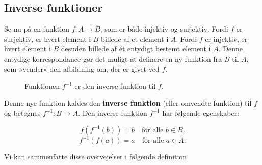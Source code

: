 \subsection*{Inverse funktioner}

Se nu på en funktion \( f: A \rightarrow B \), som er både injektiv og surjektiv. Fordi \( f \) er surjektiv, er hvert element i \( B \) billede af et element i \( A \). Fordi \( f \) er injektiv, er hvert element i \( B \) desuden billede af ét entydigt bestemt element i \( A \). Denne entydige korrespondance gør det muligt at definere en ny funktion fra \( B \) til \( A \), som »vender« den afbildning om, der er givet ved \( f \).

\begin{figure}[htbp]
\centering
{}
\caption{Funktionen $f^{-1}$ er den inverse funktion til $f$.}
\label{fig:inv}
\end{figure}

Denne nye funktion kaldes den \textbf{inverse funktion} (eller omvendte funktion) til \( f \) og betegnes \( f^{-1}: B \rightarrow A \). Den inverse funktion \( f^{-1} \) har følgende egenskaber:

\[
f(f^{-1}(b)) = b \quad \text{for alle } b \in B.
\]
\[
f^{-1}(f(a)) = a \quad \text{for alle } a \in A.
\]

Vi kan sammenfatte disse overvejelser i følgende definition

